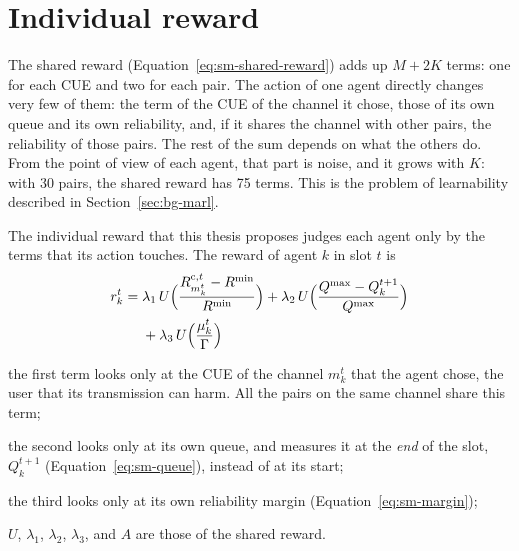 \section{Individual reward}
\label{sec:pa-individual-reward}

The shared reward (Equation~\ref{eq:sm-shared-reward}) adds up $M + 2K$ terms: one for each \ac{CUE} and two
for each pair. The action of one agent directly changes very few of them: the term of the \ac{CUE} of the
channel it chose, those of its own queue and its own reliability, and, if it shares the channel with other
pairs, the reliability of those pairs. The rest of the sum depends on what the others do. From the point of
view of each agent, that part is noise, and it grows with $K$: with 30 pairs, the shared reward has 75 terms.
This is the problem of learnability described in Section~\ref{sec:bg-marl}.

The individual reward that this thesis proposes judges each agent only by the terms that its action touches.
The reward of agent $k$ in slot $t$ is
\begin{equation}
  \begin{aligned}
    r_k^t = {} & \lambda_1\, U\Bigl( \frac{R_{m_k^t}^{\mathrm{c},t} - R^{\mathrm{min}}}{R^{\mathrm{min}}} \Bigr)
      + \lambda_2\, U\Bigl( \frac{Q^{\mathrm{max}} - Q_k^{t+1}}{Q^{\mathrm{max}}} \Bigr) \\
      & + \lambda_3\, U\Bigl( \frac{\mu_k^t}{\Gamma} \Bigr)
  \end{aligned}
  \label{eq:pa-individual-reward}
\end{equation}
\begin{wherelist}
  \item the first term looks only at the \ac{CUE} of the channel $m_k^t$ that the agent chose, the user that
    its transmission can harm. All the pairs on the same channel share this term;
  \item the second looks only at its own queue, and measures it at the \emph{end} of the slot, $Q_k^{t+1}$
    (Equation~\ref{eq:sm-queue}), instead of at its start;
  \item the third looks only at its own reliability margin (Equation~\ref{eq:sm-margin});
  \item $U$, $\lambda_1$, $\lambda_2$, $\lambda_3$, and $A$ are those of the shared reward.
\end{wherelist}

